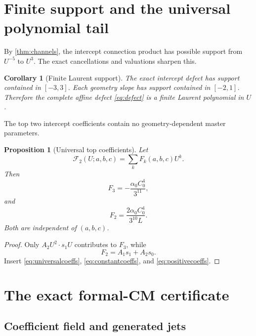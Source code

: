 \documentclass[11pt]{article}
\newtheorem{proposition}[theorem]{Proposition}
\newtheorem{corollary}[theorem]{Corollary}
\theoremstyle{definition}
\theoremstyle{remark}
\begin{document}
\section{Finite support and the universal polynomial tail}

By \cref{thm:channels}, the intercept connection product has possible support from $U^{-5}$ to $U^3$.  The exact cancellations and valuations sharpen this.

\begin{corollary}[Finite Laurent support]\label{cor:support}
The exact intercept defect has support contained in $[-3,3]$.  Each geometry slope has support contained in $[-2,1]$.  Therefore the complete affine defect \eqref{eq:defect} is a finite Laurent polynomial in $U$.
\end{corollary}

The top two intercept coefficients contain no geometry-dependent master parameters.

\begin{proposition}[Universal top coefficients]\label{prop:top}
Let
\[
 \mathscr F_2(U;a,b,c)=\sum_kF_k(a,b,c)U^k.
\]
Then
\begin{equation}\label{eq:F3}
 \boxed{F_3=-\frac{\alpha_0C_0^4}{3^{11}}},
\end{equation}
and
\begin{equation}\label{eq:F2}
 \boxed{F_2=\frac{2\alpha_0C_0^4}{3^{10}L}}.
\end{equation}
Both are independent of $(a,b,c)$.
\end{proposition}

\begin{proof}
Only $A_2U^2\cdot s_1U$ contributes to $F_3$, while
\[
 F_2=A_1s_1+A_2s_0.
\]
Insert \eqref{eq:universalcoeffs}, \eqref{eq:constantcoeffs}, and \eqref{eq:positivecoeffs}.
\end{proof}

\section{The exact formal-CM certificate}

\subsection{Coefficient field and generated jets}
\end{document}
